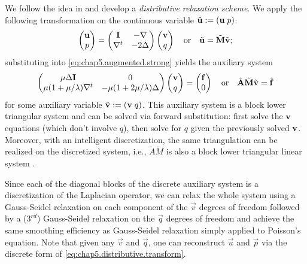 We follow the idea in \cite{Zhu.Yongning10} and develop a \emph{distributive relaxation scheme}. We apply the following transformation on the continuous variable $\tilde{\mathbf{u}} := (\mathbf{u} \; p)$:
\begin{equation} \label{eq:chap5.distributive.transform}
\begin{pmatrix} \mathbf{u} \\ p \end{pmatrix}
= \begin{pmatrix} \mathbf{I} & -\nabla \\ \nabla^t & -2 \Delta \end{pmatrix}
\begin{pmatrix} \mathbf{v} \\ q \end{pmatrix}
\quad \text{or} \quad
\tilde{\mathbf{u}} = \tilde{\mathbf{M}} \tilde{\mathbf{v}};
\end{equation}
substituting into \eqref{eq:chap5.augmented.strong} yields the auxiliary system
\begin{equation} \label{eq:chap5.distributive.triangularized}
\begin{pmatrix} \mu \Delta \mathbf{I} & 0 \\ \mu (1 + \mu / \lambda) \nabla^t & -\mu (1 + 2\mu / \lambda) \Delta \end{pmatrix}
\begin{pmatrix} \mathbf{v} \\ q \end{pmatrix}
= \begin{pmatrix} \mathbf{f} \\ 0 \end{pmatrix}
\quad \text{or} \quad
\tilde{\mathbf{A}} \tilde{\mathbf{M}} \tilde{\mathbf{v}} = \tilde{\mathbf{f}}
\end{equation}
for some auxiliary variable $\tilde{\mathbf{v}} := (\mathbf{v} \; q)$. This auxiliary system is a block lower triangular system and can be solved via forward substitution: first solve the $\mathbf{v}$ equations (which don't involve $q$), then solve for $q$ given the previously solved $\mathbf{v}$. Moreover, with an intelligent discretization, the same triangulation can be realized on the discretized system, i.e., $\tilde{A} \tilde{M}$ is also a block lower triangular linear system \cite{Zhu.Yongning10}.

Since each of the diagonal blocks of the discrete auxiliary system is a discretization of the Laplacian operator, we can relax the whole system using a Gauss-Seidel relaxation on each component of the $\vec{v}$ degrees of freedom followed by a ($3^{rd}$) Gauss-Seidel relaxation on the $\vec{q}$ degrees of freedom and achieve the same smoothing efficiency as Gauss-Seidel relaxation simply applied to Poisson's equation. Note that given any $\vec{v}$ and $\vec{q}$, one can reconstruct $\vec{u}$ and $\vec{p}$ via the discrete form of \eqref{eq:chap5.distributive.transform}.

